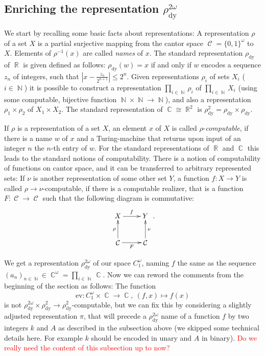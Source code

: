 \documentclass{article}
\DeclareMathOperator{\NN}{\ensuremath{\mathbb{N}}\xspace}
\DeclareMathOperator{\RR}{\ensuremath{\mathbb{R}}\xspace}
\DeclareMathOperator{\CC}{\ensuremath{\mathbb{C}}\xspace}
\DeclareMathOperator{\can}{\ensuremath{\mathcal{C}}\xspace}
\newcommand{\temp}[1]{\textcolor{red}{#1}}
\begin{document}
\subsection[Enriching the representation]{Enriching the representation $\rho_{\mathrm{dy}}^{2\omega}$}

We start by recalling some basic facts about representations: A representation $\rho$ of a set $X$ is a partial surjective mapping from the cantor space $\can = \{0,1\}^\omega$ to $X$. Elements of $\rho^{-1}(x)$ are called \emph{names} of $x$. The standard representation $\rho_{\mathrm{dy}}$ of $\RR$ is given defined as follows: $\rho_{\mathrm{dy}}(w) = x$ if and only if $w$ encodes a sequence $z_n$ of integers, such that $\left|x - \frac{z_n}{2^{n+1}}\right| \leq 2^n$. Given representations $\rho_i$ of sets $X_i$ ($i\in \NN$) it is possible to construct a representation $\prod_{i\in \NN} \rho_i$ of $\prod_{i\in \NN} X_i$ (using some computable, bijective function $\NN\times\NN\to\NN$), and also a representation $\rho_1 \times \rho_2$ of $X_1 \times X_2$. The standard representation of $\CC \cong \RR^2$ is $\rho^2_{\mathrm{dy}} = \rho_{\mathrm{dy}} \times \rho_{\mathrm{dy}}$.

If $\rho$ is a representation of a set $X$, an element $x$ of $X$ is called $\rho$-\emph{computable}, if there is a name $w$ of $x$ and a Turing-machine that returns upon input of an integer $n$ the $n$-th entry of $w$. For the standard representations of $\RR$ and $\CC$ this leads to the standard notions of computability. There is a notion of computability of functions on cantor space, and it can be transferred to arbitrary represented sets: If $\nu$ is another representation of some other set $Y$, a function $f:X\to Y$ is called $\rho\to\nu$-computable, if there is a computable realizer, that is a function $F:\can\to\can$ such that the following diagram is commutative:
\[ \begin{xy}
\xymatrix{X\ar[r]^f & Y \\ \can \ar[r]_F\ar[u]^\rho & \can \ar[u]_\nu}
\end{xy}. \]

We get a representation $\rho^{2\omega}_{\mathrm{dy}}$ of our space $C^\omega_1$, naming $f$ the same as the sequence $(a_n)_{n\in \NN} \in \CC^\omega = \prod_{i\in \NN}\CC$. Now we can reword the comments from the beginning of the section as follows: The function
\[ \mathrm{ev}: C^\omega_1\times \CC \to \CC, ~ (f,x) \mapsto f(x) \]
is not $\rho^{2\omega}_{\mathrm{dy}}\times \rho^2_{\mathrm{dy}}\to\rho^2_{\mathrm{dy}}$-computable, but we can fix this by considering a slightly adjusted representation $\pi$, that will precede a $\rho^{2\omega}_{\mathrm{dy}}$ name of a function $f$ by two integers $k$ and $A$ as described in the subsection above (we skipped some technical details here. For example $k$ should be encoded in unary and $A$ in binary). \temp{Do we really need the content of this subsection up to now?}
\end{document}
